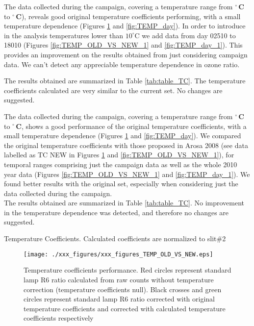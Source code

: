 \vspace{3cm}


The data collected during the campaign, covering a temperature range from \textbf{\tempmin$^\circ$\,C} to \textbf{\tempmax$^\circ$\,C}), reveals good original temperature coefficients performing, with a small temperature dependence (Figures \ref{fig:TEMP_OLD_VS_NEW} and \ref{fig:TEMP_day}). In order to introduce in the analysis temperatures lower than $10^\circ$C we add data from day 02510 to 18010 (Figures \ref{fig:TEMP_OLD_VS_NEW_1} and \ref{fig:TEMP_day_1}). This provides an improvement on the results obtained from just considering campaign data. We can't detect any appreciable temperature dependence in ozone ratio.

The results obtained are summarized in Table \ref{tab:table_TC}. The temperature coefficients calculated are very similar to the current set. No changes are suggested.

The data collected during the campaign, covering a temperature range from \textbf{\tempmin$^\circ$\,C} to \textbf{\tempmax$^\circ$\,C}, shows a good performance of the original temperature coefficients, with a small temperature dependence (Figures \ref{fig:TEMP_OLD_VS_NEW} and \ref{fig:TEMP_day}). We compared the original temperature coefficients with those proposed in Arosa 2008 (see data labelled as TC NEW in Figures \ref{fig:TEMP_OLD_VS_NEW} and \ref{fig:TEMP_OLD_VS_NEW_1}), for temporal ranges comprising just the campaign data as well as the whole 2010 year data (Figures \ref{fig:TEMP_OLD_VS_NEW_1} and \ref{fig:TEMP_day_1}). We found better results with the original set, especially when considering just the data collected during the campaign.\\
The results obtained are summarized in Table \ref{tab:table_TC}. No improvement in  the temperature dependence was detected, and therefore no changes are suggested.

\vspace{2.5cm}
\begin{table}[hbp!] \centering
	\caption{Temperature Coefficients. Calculated coefficients are normalized to slit\#2}
	\label{tab:table_TC}
	
\end{table}

\begin{figure}[htbp!]
\begin{center}   
     \texttt{[image: ./xxx\_figures/xxx\_figures\_TEMP\_OLD\_VS\_NEW.eps]}
     \caption{Temperature coefficients performance. Red circles represent standard lamp R6 ratio calculated from raw counts without temperature correction (temperature coefficients null). Black crosses and green circles represent standard lamp R6 ratio corrected with original temperature coefficients and corrected with calculated temperature coefficients respectively}
	   \label{fig:TEMP_OLD_VS_NEW}
\end{center}
\end{figure}


